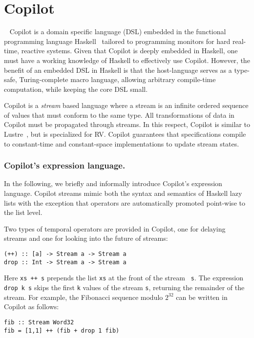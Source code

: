 \section{Copilot}~\label{sec:co-intro} 
Copilot is a domain specific language (DSL)  embedded in the functional
programming language Haskell~\cite{Haskell98}   tailored to
programming monitors for hard real-time, reactive systems. Given that
Copilot is deeply embedded in Haskell, one must have a working
knowledge of Haskell to effectively use Copilot. However, the benefit of an
embedded DSL in Haskell is that the host-language serves as a type-safe,
Turing-complete macro language, allowing arbitrary compile-time computation,
while keeping the core DSL small.

Copilot is a \emph{stream} based language where a stream is an infinite ordered
sequence of values that must conform to the same type.  All transformations of
data in Copilot must be propagated through streams.  In this respect, Copilot is
similar to Lustre~\cite{CaspiPHP87}, but is specialized for RV. Copilot
guarantees that specifications compile to constant-time and constant-space
implementations to update stream states.

\subsubsection{Copilot's expression language.}
In the following, we briefly and informally introduce Copilot's expression
language.  Copilot streams mimic both the syntax and semantics of
Haskell lazy lists with the exception that  operators are
automatically promoted point-wise to the list level. 

Two types of temporal operators are provided in Copilot, one for
delaying streams and one for looking into the future of streams:
\begin{lstlisting}[frame=single]
(++) :: [a] -> Stream a -> Stream a
drop :: Int -> Stream a -> Stream a
\end{lstlisting}
%
Here {\tt xs ++ s} prepends the list {\tt xs} at the front of the stream {\tt
  s}.  The expression {\tt drop k s} skips the first {\tt k} values of the
stream {\tt s}, returning the remainder of the stream. For example, the
Fibonacci sequence modulo $2^{32}$ can be written in Copilot as follows:

\begin{lstlisting}[frame=single]
fib :: Stream Word32
fib = [1,1] ++ (fib + drop 1 fib)
\end{lstlisting}
%

